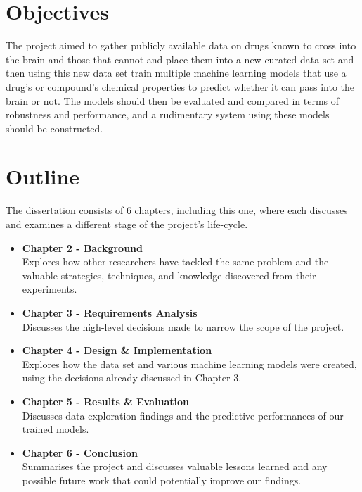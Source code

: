 \section{Objectives}
\label{sec:Objectives}

The project aimed to gather publicly available data on drugs known to cross into the brain and those that cannot and place them into a new curated data set and then using this new data set train multiple machine learning models that use a drug's or compound's chemical properties to predict whether it can pass into the brain or not. The models should then be evaluated and compared in terms of robustness and performance, and a rudimentary system using these models should be constructed.

\section{Outline}

The dissertation consists of 6 chapters, including this one, where each discusses and examines a different stage of the project's life-cycle.

\begin{itemize}
\item \textbf{Chapter 2 - Background} \\
Explores how other researchers have tackled the same problem and the valuable strategies, techniques, and knowledge discovered from their experiments.
\item \textbf{Chapter 3 - Requirements Analysis} \\
Discusses the high-level decisions made to narrow the scope of the project.
\item \textbf{Chapter 4 - Design \& Implementation} \\
Explores how the data set and various machine learning models
were created, using the decisions already discussed in Chapter 3.
\item \textbf{Chapter 5 - Results \& Evaluation} \\
Discusses data exploration findings and the predictive performances of our trained models.
\item \textbf{Chapter 6 - Conclusion} \\
Summarises the project and discusses valuable lessons learned and any possible future work that could potentially improve our findings. 
\end{itemize}